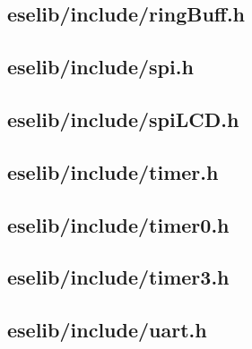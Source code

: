 \documentclass[12pt,a4paper,titlepage,oneside]{article}
\begin{document}
\subsection{eselib/include/ringBuff.h}

\newpage
\subsection{eselib/include/spi.h}

\newpage
\subsection{eselib/include/spiLCD.h}

\newpage
\subsection{eselib/include/timer.h}

\newpage
\subsection{eselib/include/timer0.h}

\newpage
\subsection{eselib/include/timer3.h}

\newpage
\subsection{eselib/include/uart.h}

\newpage
\end{document}
